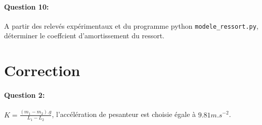 \paragraph{Question 10:} A partir des relevés expérimentaux et du programme python \verb?modele_ressort.py?, déterminer le coeffcient d'amortissement du ressort.

\clearpage

\ifdef{\public}{}{}

\newpage

\pagestyle{correction}

\section{Correction}

\paragraph{Question 2:} 

$K=\frac{(m_1-m_2).g}{L_1-L_2}$, l'accélération de pesanteur est choisie égale à $9.81m.s^{-2}$.


